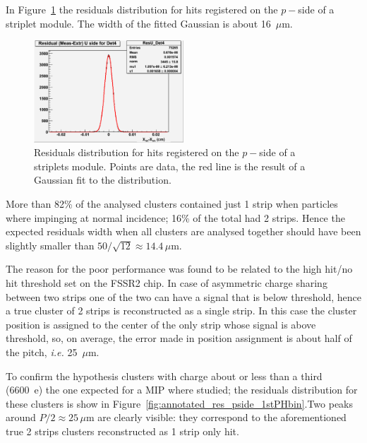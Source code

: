 In Figure~\ref{fig:res_pside} the residuals distribution for hits registered on the $p-$side of a striplet 
module. The width of the fitted Gaussian is about 16~$\mu$m.

\begin{figure}[!htpb]
\centering
\includegraphics[width=0.5\textwidth]{res_pisde.pdf}
\caption{\label{fig:res_pside}Residuals distribution for hits registered on the $p-$side of a 
striplets module. Points are data, the red line is the result of a Gaussian fit to the distribution.}
\end{figure}

More than 82\% of the analysed clusters contained just 1 strip when particles where impinging 
at normal incidence; 16\% of the total had 2 strips. Hence the expected residuals width when all 
clusters are analysed together should have been slightly smaller than 
$50/\sqrt{12}\approx 14.4\, \mu$m. 

The reason for the poor performance was found to be related to the high hit/no hit threshold set 
on the FSSR2 chip. In case of asymmetric charge sharing between two strips one of the two 
can have a signal that is below threshold, hence a true cluster of 2 strips is reconstructed as a single 
strip. In this case the cluster position is assigned to the center of the only strip whose signal is 
above threshold, so, on average, the error made in position assignment is about half of the pitch, 
{\it i.e.} 25~$\mu$m.

To confirm the hypothesis clusters with charge about or less than
 a third (6600~e) the one expected for a MIP where 
studied; the residuals distribution for these clusters is show in 
Figure~\ref{fig:annotated_res_pside_1stPHbin}.Two peaks around $P/2\approx25\,\mu$m are clearly visible: they correspond to the aforementioned true 2 strips clusters reconstructed as 1 strip only 
hit.


